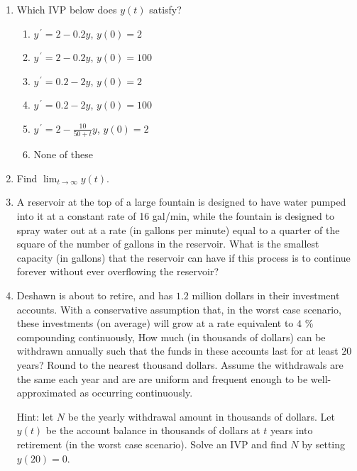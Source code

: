 \documentclass{ximera}
\begin{document}
\begin{enumerate}[label=(\arabic*)]

\item  Which IVP below does $y(t)$ satisfy?

\begin{enumerate}[label=(\alph*)]
\item $y^{\,\prime}=2-0.2y$, $y(0)=2$  
\item $y^{\,\prime}=2-0.2y$, $y(0)=100$ %
\item $y^{\,\prime}=0.2-2y$, $y(0)=2$
\item $y^{\,\prime}=0.2-2y$, $y(0)=100$
\item $\displaystyle y^{\,\prime}=2-\frac{10}{50+t}y$, $y(0)=2$
\item None of these
\end{enumerate}


\item Find $\displaystyle \lim_{t\rightarrow \infty} y(t)$. 




\newpage

\item A reservoir at the top of a large fountain is designed to have water pumped into it at a constant rate of 16 gal/min, while the fountain is designed to spray water out at a rate (in gallons per minute) equal to a quarter of the square of the number of gallons in the reservoir.  What is the smallest capacity (in gallons) that the reservoir can have if this process is to continue forever without ever overflowing the reservoir?




\item Deshawn is about to retire, and has $1.2$ million dollars in their investment accounts.  With a conservative assumption that, in the worst case scenario, these investments (on average) will grow at a rate equivalent to $4$ \% compounding continuously, How much (in thousands of dollars) can be withdrawn annually such that the funds in these accounts last for at least $20$ years?    Round to the nearest thousand dollars.  Assume the withdrawals are the same each year and are are uniform and frequent enough to be well-approximated as occurring continuously. 

Hint: let $N$ be the yearly withdrawal amount in thousands of dollars.  Let $y(t)$ be the account balance in thousands of dollars at $t$ years into retirement (in the worst case scenario).  Solve an IVP and find $N$ by setting $y(20)=0$.


\end{enumerate}
\end{document}
